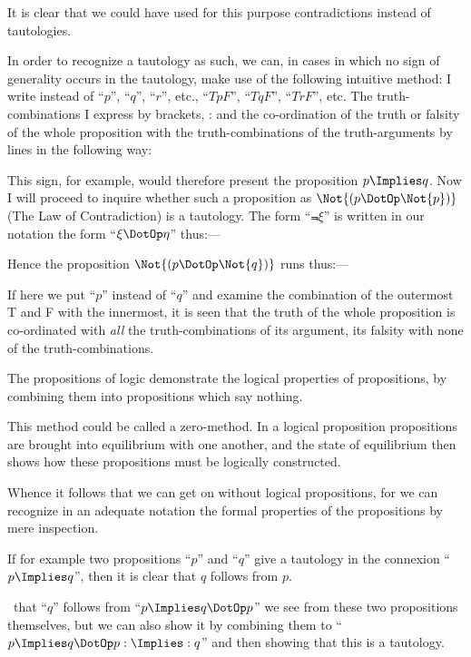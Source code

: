 {It is clear that we could have used for this
purpose contradictions instead of tautologies.}


{In order to recognize a tautology as such, we
can, in cases in which no sign of generality occurs
in the tautology, make use of the following intuitive
method: I write instead of ``$p$'', ``$q$'', ``$r$'', etc.,
``$TpF$'', ``$TqF$'', ``$TrF$'', etc. The truth-combinations
I express by brackets, \exempliGratia:
and the co-ordination of the truth or falsity of the
whole proposition with the truth-combinations of
the truth-arguments by lines in the following way:

This sign, for example, would therefore present
the proposition $p \Implies q$. Now I will proceed
to inquire whether such a proposition as $\Not{(p \DotOp \Not{p})}$
(The Law of Contradiction) is a tautology. The
form ``$\Not{\xi}$'' is written in our notation
the form ``$\xi \DotOp \eta$'' thus:---
\enlargethispage{-29pt} %

Hence the proposition $\Not{(p \DotOp \Not{q})}$ runs thus:---

If here we put ``$p$'' instead of ``$q$'' and examine
the combination of the outermost T and F with the
innermost, it is seen that the truth of the whole
proposition is co-ordinated with \emph{all} the truth-combinations
of its argument, its falsity with none of
the truth-combinations.}


{The propositions of logic demonstrate the logical
properties of propositions, by combining them into
propositions which say nothing.

This method could be called a zero-method. In
a logical proposition propositions are brought into
equilibrium with one another, and the state of
equilibrium then shows how these propositions
must be logically constructed.}


{Whence it follows that we can get on without
logical propositions, for we can recognize in an
adequate notation the formal properties of the propositions
by mere inspection.}


{If for example two propositions ``$p$'' and ``$q$''
give a tautology in the connexion ``$p \Implies q$'', then
it is clear that $q$ follows from $p$.

\ExempliGratia\ that ``$q$'' follows from ``$p \Implies q \DotOp p$'' we see from
these two propositions themselves, but we can also
show it by combining them to ``$p \Implies q \DotOp p : \Implies : q$'' and
then showing that this is a tautology.}


